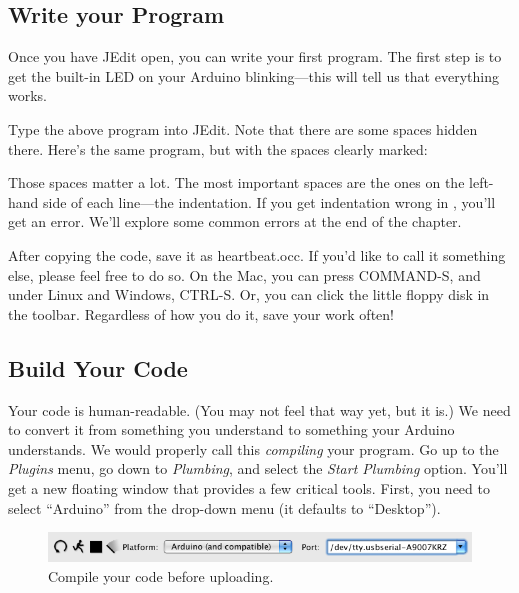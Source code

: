\afterpage{\clearpage}

\subsection{Write your Program}
Once you have JEdit open, you can write your first program. The first step is to get the built-in LED on your Arduino blinking---this will tell us that everything works. 



Type the above program into JEdit. Note that there are some spaces hidden there. Here's the same program, but with the spaces clearly marked:



Those {\strong spaces matter a lot}. The most important spaces are the ones on the left-hand side of each line---the {\strong indentation}. If you get indentation wrong in \occam, you'll get an error. We'll explore some common errors at the end of the chapter. 

After copying the code, save it as {\code heartbeat.occ}. If you'd like to call it something else, please feel free to do so. On the Mac, you can press COMMAND-S, and under Linux and Windows, CTRL-S. Or, you can click the little floppy disk in the toolbar. Regardless of how you do it, save your work often!


\subsection{Build Your Code}
Your code is human-readable. (You may not feel that way yet, but it is.) We need to convert it from something you understand to something your Arduino understands. We would properly call this {\em compiling} your program. Go up to the {\em Plugins} menu, go down to {\em Plumbing}, and select the {\em Start Plumbing} option. You'll get a new floating window that provides a few critical tools. First, you need to select ``Arduino'' from the drop-down menu (it defaults to ``Desktop'').

\begin{figure}[ht]
  \begin{center}
    \includegraphics[width=1.0\linewidth]{screenshots/20100108-compile-button}
    \caption{Compile your code before uploading.}
    \label{screenshot:compile-button}
  \end{center}
\end{figure}

